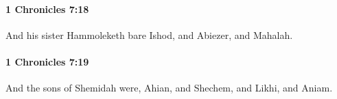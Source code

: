 		\paragraph{1 Chronicles 7:18} %
			\label{1CHRONICLES-7-18}

			And his sister Hammoleketh bare Ishod, and Abiezer, and Mahalah.


		\paragraph{1 Chronicles 7:19} %
			\label{1CHRONICLES-7-19}

			And the sons of Shemidah were, Ahian, and Shechem, and Likhi, and Aniam.


